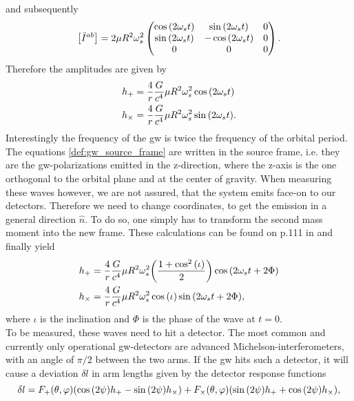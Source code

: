 and subsequently
\begin{equation}\label{def:binary_system_second_mass_moment_time_derivative}
\left[ \ddot{I}^{ab}\right] = 2 \mu R^2\omega_s^2
	\begin{pmatrix}
		\cos{\left( 2\omega_s t \right)} & \sin{\left( 2\omega_s t \right)} & 0\\
		\sin{\left( 2\omega_s t \right)} & -\cos{\left( 2\omega_s t \right)} & 0\\
		0 & 0 & 0
	\end{pmatrix}.
\end{equation}
Therefore the amplitudes are given by
\begin{align}\label{def:gw_source_frame}
h_+ &= \frac{4}{r}\frac{G}{c^4}\mu R^2 \omega_s^2\cos{\left( 2\omega_s t \right)}\nonumber\\
h_\times &= \frac{4}{r}\frac{G}{c^4}\mu R^2 \omega_s^2\sin{\left( 2\omega_s t \right)}.
\end{align}
Interestingly the frequency of the \gls{gw} is twice the frequency of the orbital period.\\
The equations \eqref{def:gw_source_frame} are written in the source frame, i.e. they are the \gls{gw}-polarizations emitted in the z-direction, where the z-axis is the one orthogonal to the orbital plane and at the center of gravity. When measuring these waves however, we are not assured, that the system emits face-on to our detectors. Therefore we need to change coordinates, to get the emission in a general direction $\hat{n}$. To do so, one simply has to transform the second mass moment into the new frame. These calculations can be found on p.111 in \cite{gwv1} and finally yield
\begin{align}\label{def:gw_travel_direction}
h_+ &= \frac{4}{r}\frac{G}{c^4}\mu R^2 \omega_s^2{\left( \frac{1+\cos^2{\left( \iota \right)}}{2} \right)}\cos{\left( 2\omega_s t+2\Phi \right)}\nonumber\\
h_\times &= \frac{4}{r}\frac{G}{c^4}\mu R^2 \omega_s^2\cos{\left( \iota \right)}\sin{\left( 2\omega_s t+2\Phi \right)},
\end{align}
where $\iota$ is the inclination and $\Phi$ is the phase of the wave at $t=0$.\medskip\\
To be measured, these waves need to hit a detector. The most common and currently only operational \gls{gw}-detectors are advanced Michelson-interferometers, with an angle of $\pi/2$ between the two arms. If the \gls{gw} hits such a detector, it will cause a deviation $\delta l$ in arm lengths given by the detector response functions
\begin{equation}\label{def:detector_response}
\delta l = F_+{\left( \theta, \varphi \right)}{\left( \cos{\left( 2\psi \right)}h_+ - \sin{\left( 2\psi \right)} h_\times \right)} + F_\times{\left( \theta, \varphi \right)}{\left( \sin{\left( 2\psi \right)}h_+ + \cos{\left( 2\psi \right)} h_\times \right)},
\end{equation}
